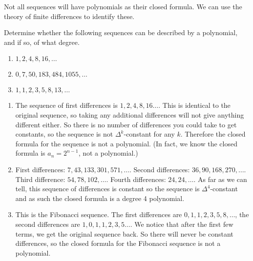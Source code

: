 \documentclass[12pt]{article}
\begin{document}
Not all sequences will have polynomials as their closed formula.  We can use the theory of finite differences to identify these.

\begin{example}
  Determine whether the following sequences can be described by a polynomial, and if so, of what degree.
  \begin{enumerate}
    \item $1, 2, 4, 8, 16, \ldots$
    \item $0, 7, 50, 183, 484, 1055, \ldots$
    \item $1,1,2,3,5,8,13,\ldots$
  \end{enumerate}
\begin{solution}
  \begin{enumerate}
    \item The sequence of first differences is $1, 2, 4, 8, 16\ldots$.  This is identical to the original sequence, so taking any additional differences will not give anything different either.  So there is no number of differences you could take to get constants, so the sequence is not $\Delta^k$-constant for any $k$.  Therefore the closed formula for the sequence is not a polynomial.  (In fact, we know the closed formula is $a_n = 2^{n-1}$, not a polynomial.)
    \item First differences: $7, 43, 133, 301, 571,\ldots$.  Second differences: $36, 90, 168, 270,\ldots$.  Third difference: $54, 78, 102,\ldots$.  Fourth differences: $24, 24, \ldots$.  As far as we can tell, this sequence of differences is constant so the sequence is $\Delta^4$-constant and as such the closed formula is a degree 4 polynomial.
    \item This is the Fibonacci sequence.  The first differences are $0, 1, 1, 2, 3, 5, 8, \ldots$, the second differences are $1, 0, 1, 1, 2, 3,5\ldots$.  We notice that after the first few terms, we get the original sequence back.  So there will never be constant differences, so the closed formula for the Fibonacci sequence is not a polynomial.
  \end{enumerate}

\end{solution}

\end{example}
\end{document}
